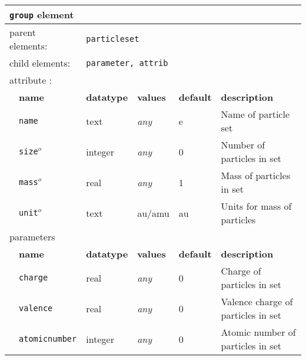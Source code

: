 \begin{table}[h]
\begin{center}
\begin{tabularx}{\textwidth}{l l l l l X }
\hline
\multicolumn{6}{l}{\texttt{group} element} \\
\hline
\multicolumn{2}{l}{parent elements:} & \multicolumn{4}{l}{\texttt{particleset}}\\
\multicolumn{2}{l}{child  elements:} & \multicolumn{4}{l}{\texttt{parameter, attrib}}\\
\multicolumn{2}{l}{attribute      :} & \multicolumn{4}{l}{}\\
   &   \bfseries name            & \bfseries datatype & \bfseries values & \bfseries default   & \bfseries description \\
   &   \texttt{name}               &  text              &  \textit{any}    &  e                & Name of particle set  \\
   &   \texttt{size}$^o$           &  integer           &  \textit{any}    &  0                & Number of particles in set \\
   &   \texttt{mass}$^o$           &  real              &  \textit{any}    &  1                & Mass of particles in set \\
   &   \texttt{unit}$^o$          &  text              &  au/amu          &  au               & Units for mass of particles \\
\multicolumn{2}{l}{parameters}  & \multicolumn{4}{l}{}\\
   &   \bfseries name     & \bfseries datatype & \bfseries values & \bfseries default   & \bfseries description \\
   &   \texttt{charge}    &  real              &  \textit{any}    &  0                  & Charge of particles in set \\
   &   \texttt{valence}   &  real              &  \textit{any}    &  0                  & Valence charge of particles in set \\
   &   \texttt{atomicnumber} &  integer        &  \textit{any}    &  0                  & Atomic number of particles in set \\
  \hline
  \hline
\end{tabularx}
\end{center}
\end{table}


